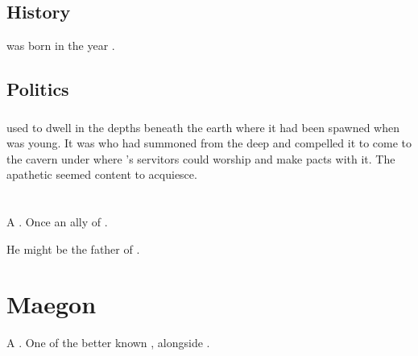 \subsection{History}
\Ishtacca was born in the year .









\subsection{Politics}





\subsubsection{\Ubloth}
 used to dwell in the depths beneath the earth where it had been spawned when \Miith was young. 
It was \Ishtacca who had summoned \Ubloth from the deep and compelled it to come to the cavern under \Yormis where \Ishtacca's servitors could worship \Ubloth and make pacts with it. 
The apathetic  seemed content to acquiesce.
















\section{\Iurzmacul}
\index{\Iurzmacul}
A \nagalord. 
Once an ally of \TyarithXserasshana. 

He might be the father of .



















\section{Maegon}
A \nagalord. 
One of the better known \nagalords, alongside . 

